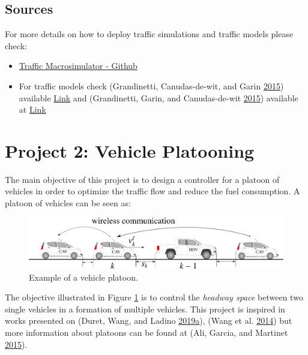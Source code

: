 \documentclass[]{book}
\theoremstyle{definition}
\theoremstyle{definition}
\theoremstyle{definition}
\theoremstyle{remark}
\begin{document}
\hypertarget{sources}{%
\section*{Sources}\label{sources}}

For more details on how to deploy traffic simulations and traffic models
please check:

\begin{itemize}
\item
  \href{https://github.com/andres-ladino-ifsttar/traffic-macrosimulator}{Traffic
  Macrosimulator - Github}
\item
  For traffic models check (Grandinetti, Canudas-de-wit, and Garin
  \protect\hyperlink{ref-Grandinetti2015}{2015}) available
  \href{https://hal.archives-ouvertes.fr/hal-01188535}{Link} and
  (Grandinetti, Garin, and Canudas-de-wit
  \protect\hyperlink{ref-Grandinetti2016}{2015}) available at
  \href{https://hal.archives-ouvertes.fr/hal-01188811}{Link}
\end{itemize}

\hypertarget{project-2-vehicle-platooning}{%
\chapter*{Project 2: Vehicle
Platooning}\label{project-2-vehicle-platooning}}

The main objective of this project is to design a controller for a
platoon of vehicles in order to optimize the traffic flow and reduce the
fuel consumption. A platoon of vehicles can be seen as:



\begin{figure}

{\centering \includegraphics{images/p2-cavs} 

}

\caption{Example of a vehicle platoon.}\label{fig:cav}
\end{figure}

The objective illustrated in Figure \ref{fig:cav} is to control the
\emph{headway space} between two single vehicles in a formation of
multiple vehicles. This project is inspired in works presented on
(Duret, Wang, and Ladino
\protect\hyperlink{ref-Duret2019:ISTTT}{2019}\protect\hyperlink{ref-Duret2019:ISTTT}{a}),
(Wang et al. \protect\hyperlink{ref-Meng2014b:TR-C}{2014}) but more
information about platoons can be found at (Ali, Garcia, and Martinet
\protect\hyperlink{ref-Ali2015:ITSM}{2015}).
\end{document}
